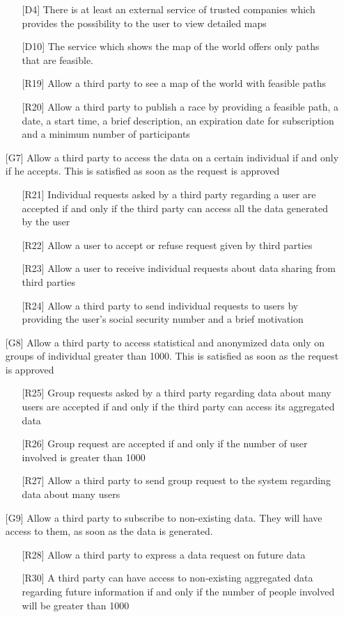 \begin{itemize}
\begin{itemize}
	\item[{[D4]}] There is at least an external service of trusted companies which provides the possibility to the user to view detailed maps
	\item[{[D10]}] The service which shows the map of the world offers only paths that are feasible.
	\item[{[R19]}] Allow a third party to see a map of the world with feasible paths
	\item[{[R20]}] Allow a third party to publish a race by providing a feasible path, a date, a start time, a brief description, an expiration date for subscription and a minimum number of participants
	\end{itemize}
\item[{[G7]}] Allow a third party to access the data on a certain individual if and only if he accepts. This is satisfied as soon as the request is approved
	\begin{itemize}
	\item[{[R21]}] Individual requests asked by a third party regarding a user are accepted if and only if the third party can access all the data generated by the user
	\item[{[R22]}] Allow a user to accept or refuse request given by third parties
	\item[{[R23]}] Allow a user to receive individual requests about data sharing from third parties
	\item[{[R24]}] Allow a third party to send individual requests to users by providing the user's social security number and a brief motivation
	\end{itemize}
\item[{[G8]}] Allow a third party to access statistical and anonymized data only on groups of individual greater than 1000. This is satisfied as soon as the request is approved
	\begin{itemize}
	\item[{[R25]}] Group requests asked by a third party regarding data about many users are accepted if and only if the third party can access its aggregated data
	\item[{[R26]}] Group request are accepted if and only if the number of user involved is greater than 1000
	\item[{[R27]}] Allow a third party to send group request to the system regarding data about many users
	\end{itemize}
\item[{[G9]}] Allow a third party to subscribe to non-existing data. They will have access to them, as soon as the data is generated. 
	\begin{itemize}
	\item[{[R28]}] Allow a third party to express a data request on future data
	\item[{[R30]}] A third party can have access to non-existing aggregated data regarding future information if and only if the number of people involved will be greater than 1000
	\end{itemize}
\end{itemize}